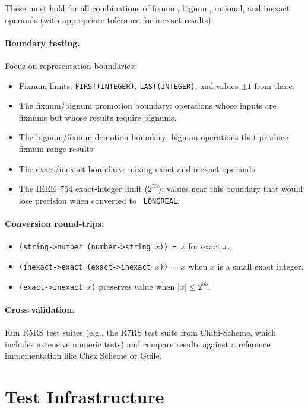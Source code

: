 \documentclass[12pt]{report}
\begin{document}
\noindent These must hold for all combinations of fixnum, bignum,
rational, and inexact operands (with appropriate tolerance for
inexact results).

\paragraph{Boundary testing.}
Focus on representation boundaries:

\begin{itemize}
\item Fixnum limits: {\tt FIRST(INTEGER)}, {\tt LAST(INTEGER)},
  and values $\pm 1$ from these.
\item The fixnum/bignum promotion boundary: operations whose inputs
  are fixnums but whose results require bignums.
\item The bignum/fixnum demotion boundary: bignum operations that
  produce fixnum-range results.
\item The exact/inexact boundary: mixing exact and inexact operands.
\item The IEEE~754 exact-integer limit ($2^{53}$): values near
  this boundary that would lose precision when converted to {\tt
  LONGREAL}.
\end{itemize}

\paragraph{Conversion round-trips.}
\begin{itemize}
\item {\tt (string->number (number->string $x$)) = $x$} for exact $x$.
\item {\tt (inexact->exact (exact->inexact $x$)) = $x$} when $x$ is
  a small exact integer.
\item {\tt (exact->inexact $x$)} preserves value when $|x| \leq 2^{53}$.
\end{itemize}

\paragraph{Cross-validation.}
Run R5RS test suites (e.g., the R7RS test suite from Chibi-Scheme,
which includes extensive numeric tests) and compare results against
a reference implementation like Chez Scheme or Guile.

\section{Test Infrastructure}
\end{document}
